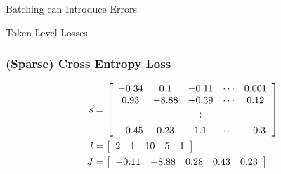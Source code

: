 \documentclass{beamer}
\begin{document}
\begin{section}{Batching can Introduce Errors}
\begin{subsection}{Token Level Losses}
        \begin{frame}
            \frametitle{(Sparse) Cross Entropy Loss}
            \begin{align*}
                s &= \left[ \begin{array}{*5{c}}
                    -0.34 & 0.1 & -0.11 & \cdots & 0.001 \\
                    0.93 & -8.88 & -0.39 & \cdots & 0.12 \\
                    & & \vdots & & \\
                    -0.45 & 0.23 & 1.1 & \cdots & -0.3
                \end{array} \right] \\
                l &= \left[ \begin{array}{*5{c}}
                    2 & 1 & 10 & 5 & 1
                \end{array} \right] \\
                J &= \left[ \begin{array}{*5{c}}
                    -0.11 & -8.88 & 0.28 & 0.43 & 0.23
                \end{array} \right]
            \end{align*}
        \end{frame}


\end{subsection}
\end{section}
\end{document}
